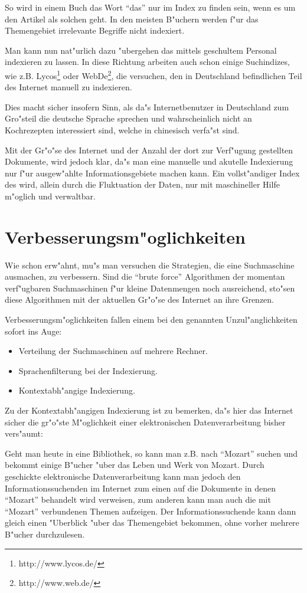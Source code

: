 So wird in einem Buch das Wort "`das"' nur im Index zu finden sein, wenn es um den Artikel als solchen geht. In den meisten B"uchern werden f"ur das Themengebiet irrelevante Begriffe nicht indexiert.

Man kann nun nat"urlich dazu "ubergehen das \www mittels geschultem Personal indexieren zu lassen. In diese Richtung arbeiten auch schon einige Suchindizes, wie z.B. Lycos\footnote{http://www.lycos.de/} oder WebDe\footnote{http://www.web.de/}, die versuchen, den in Deutschland befindlichen Teil des Internet manuell zu indexieren.

Dies macht sicher insofern Sinn, als da"s Internetbenutzer in Deutschland zum Gro"steil die deutsche Sprache sprechen und wahrscheinlich nicht an Kochrezepten interessiert sind, welche in chinesisch verfa"st sind.

Mit der Gr"o"se des Internet und der Anzahl der dort zur Verf"ugung gestellten Dokumente, wird jedoch klar, da"s man eine manuelle und akutelle Indexierung nur f"ur ausgew"ahlte Informationsgebiete machen kann. Ein vollst"andiger Index des \www wird, allein durch die Fluktuation der Daten, nur mit maschineller Hilfe m"oglich und verwaltbar.


\section{Verbesserungsm"oglichkeiten}
Wie schon erw"ahnt, mu"s man versuchen die Strategien, die eine Suchmaschine ausmachen, zu verbessern. Sind die "`brute force"' Algorithmen der momentan verf"ugbaren Suchmaschinen f"ur kleine Datenmengen noch ausreichend, sto"sen diese Algorithmen mit der aktuellen Gr"o"se des Internet an ihre Grenzen.

Verbesserungsm"oglichkeiten fallen einem bei den genannten Unzul"anglichkeiten sofort ins Auge:
\begin{itemize}
	\item	Verteilung der Suchmaschinen auf mehrere Rechner.
	\item	Sprachenfilterung bei der Indexierung.
	\item 	Kontextabh"angige Indexierung.
\end{itemize}
Zu der Kontextabh"angigen Indexierung ist zu bemerken, da"s hier das Internet sicher die gr"o"ste M"oglichkeit einer elektronischen Datenverarbeitung bisher vers"aumt:

Geht man heute in eine Bibliothek, so kann man z.B. nach "`Mozart"' suchen und bekommt einige B"ucher "uber das Leben und Werk von Mozart. Durch geschickte elektronische Datenverarbeitung kann man jedoch den Informationssuchenden im Internet zum einen auf die Dokumente in denen "`Mozart"' behandelt wird verweisen, zum anderen kann man auch die mit "`Mozart"' verbundenen Themen aufzeigen. Der Informationssuchende kann dann gleich einen "Uberblick "uber das Themengebiet bekommen, ohne vorher mehrere B"ucher durchzulesen.


